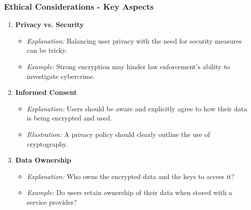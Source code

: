 \documentclass{beamer}
\begin{document}
\begin{frame}[fragile]
    \frametitle{Ethical Considerations - Key Aspects}
    \begin{enumerate}
        \item \textbf{Privacy vs. Security}
            \begin{itemize}
                \item \textit{Explanation:} Balancing user privacy with the need for security measures can be tricky.
                \item \textit{Example:} Strong encryption may hinder law enforcement's ability to investigate cybercrime.
            \end{itemize}

        \item \textbf{Informed Consent}
            \begin{itemize}
                \item \textit{Explanation:} Users should be aware and explicitly agree to how their data is being encrypted and used.
                \item \textit{Illustration:} A privacy policy should clearly outline the use of cryptography.
            \end{itemize}

        \item \textbf{Data Ownership}
            \begin{itemize}
                \item \textit{Explanation:} Who owns the encrypted data and the keys to access it?
                \item \textit{Example:} Do users retain ownership of their data when stored with a service provider?
            \end{itemize}
    \end{enumerate}
\end{frame}
\end{document}
